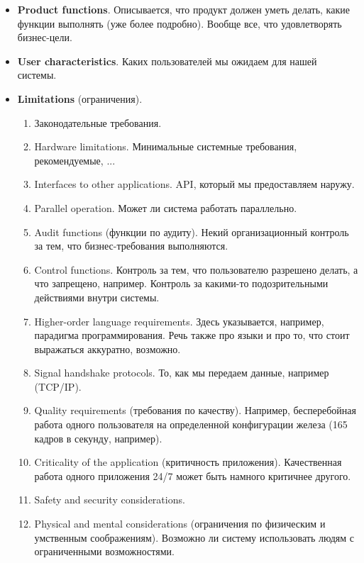\begin{Def}
\begin{itemize}
            \item \textbf{Product functions}. Описывается, что продукт должен уметь делать, какие функции выполнять (уже более подробно). Вообще все, что удовлетворять бизнес-цели.

            \item \textbf{User characteristics}. Каких пользователей мы ожидаем для нашей системы. 

            \item \textbf{Limitations} (ограничения).
            \begin{enumerate}
                \item Законодательные требования.
                \item Hardware limitations. Минимальные системные требования, рекомендуемые, ...
                \item Interfaces to other applications. API, который мы предоставляем наружу.
                \item Parallel operation. Может ли система работать параллельно.
                \item Audit functions (функции по аудиту). Некий организационный контроль за тем, что бизнес-требования выполняются.
                \item Control functions. Контроль за тем, что пользователю разрешено делать, а что запрещено, например. Контроль за какими-то подозрительными действиями внутри системы.
                \item Higher-order language requirements. Здесь указывается, например, парадигма программирования. Речь также про языки и про то, что стоит выражаться аккуратно, возможно.
                \item Signal handshake protocols. То, как мы передаем данные, например (TCP/IP).
                \item Quality requirements (требования по качеству). Например, бесперебойная работа одного пользователя на определенной конфигурации железа (165 кадров в секунду, например).
                \item Criticality of the application (критичность приложения). Качественная работа одного приложения 24/7 может быть намного критичнее другого. 
                \item Safety and security considerations. 
                \item Physical and mental considerations (ограничения по физическим и умственным соображениям). Возможно ли систему использовать людям с ограниченными возможностями.
            \end{enumerate} 


\end{itemize}
\end{Def}
